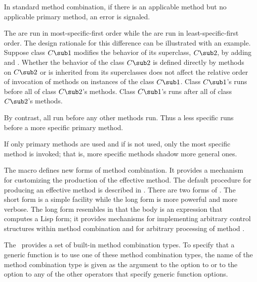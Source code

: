 \endlist

In standard method combination, if there is an applicable method
but no applicable primary method, an error is signaled.
     
The  are run in most-specific-first order while
the  are run in least-specific-first order.  The
design rationale for this difference can be illustrated with an
example.  Suppose class $C\sub 1$ modifies the behavior of its
superclass, $C\sub 2$, by adding  and .
Whether the behavior of the class $C\sub 2$ is defined
directly by methods on $C\sub 2$ or is inherited from its superclasses
does not affect the relative order of invocation of methods on
instances of the class $C\sub 1$.  Class $C\sub 1$'s 
 runs before all of class $C\sub 2$'s methods.  
Class $C\sub 1$'s  runs after all of class $C\sub 2$'s methods.

By contrast, all  run before any other methods
run.  Thus a less specific  runs before a more
specific primary method.

If only primary methods are used and if  is not
used, only the most specific method is invoked; that is, more specific
methods shadow more general ones. 

\endsubsubsection%

           
The macro  defines new forms of method
combination.  It provides a mechanism for customizing the production
of the effective method. The default procedure for producing an
effective method is described in \secref\DeterminingtheEffectiveMethod.
There are two forms of
.  The short form is a simple facility while
the long form is more powerful and more verbose.  The long form
resembles  in that the body is an expression that
computes a Lisp form; it provides mechanisms for implementing
arbitrary control structures within method combination and for
arbitrary processing of method .  

\endsubsubsection%


The \CLOS\ provides a set of built-in method combination types.  To
specify that a generic function is to use one of these method
combination types, the name of the method combination type is given as
the argument to the  option to 
 or to the  option to any of the
other operators that specify generic function options.

